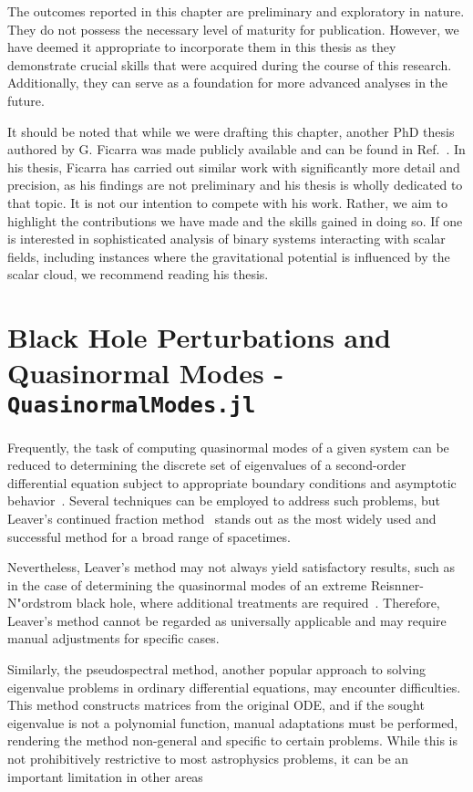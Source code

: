 The outcomes reported in this chapter are preliminary and exploratory in nature. They do not possess the necessary level of maturity for publication. However, we have deemed it appropriate to incorporate them in this thesis as they demonstrate crucial skills that were acquired during the course of this research. Additionally, they can serve as a foundation for more advanced analyses in the future.

It should be noted that while we were drafting this chapter, another PhD thesis authored by G. Ficarra was made publicly available and can be found in Ref.~\cite{Ficarra2023}. In his thesis, Ficarra has carried out similar work with significantly more detail and precision, as his findings are not preliminary and his thesis is wholly dedicated to that topic. It is not our intention to compete with his work. Rather, we aim to highlight the contributions we have made and the skills gained in doing so. If one is interested in sophisticated analysis of binary systems interacting with scalar fields, including instances where the gravitational potential is influenced by the scalar cloud, we recommend reading his thesis.

\section*{Black Hole Perturbations and Quasinormal Modes - \texttt{QuasinormalModes.jl}}

Frequently, the task of computing quasinormal modes of a given system can be reduced to determining the discrete set of eigenvalues of a second-order differential equation subject to appropriate boundary conditions and asymptotic behavior~\cite{review3}. Several techniques can be employed to address such problems, but Leaver's continued fraction method~\cite{Leaver1985} stands out as the most widely used and successful method for a broad range of spacetimes.

Nevertheless, Leaver's method may not always yield satisfactory results, such as in the case of determining the quasinormal modes of an extreme Reisnner-N"ordstrom black hole, where additional treatments are required~\cite{PhysRevD.93.064062}. Therefore, Leaver's method cannot be regarded as universally applicable and may require manual adjustments for specific cases.

Similarly, the pseudospectral method, another popular approach to solving eigenvalue problems in ordinary differential equations, may encounter difficulties. This method constructs matrices from the original \ac{ODE}, and if the sought eigenvalue is not a polynomial function, manual adaptations must be performed, rendering the method non-general and specific to certain problems. While this is not prohibitively restrictive to most astrophysics problems, it can be an important limitation in other areas

